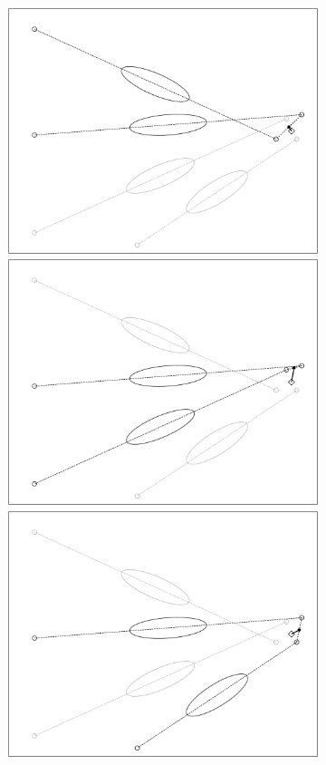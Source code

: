 \begin{figure}
    \centering
    \captionsetup{width=0.9\linewidth}
    \begin{subfigure}{0.45\textwidth}
        \includegraphics[width=\linewidth]{Plots/stereo_magic_1.pdf}
        \includegraphics[width=\linewidth]{Plots/stereo_magic_2.pdf}
        \includegraphics[width=\linewidth]{Plots/stereo_magic_3.pdf}

\end{subfigure}
\end{figure}
